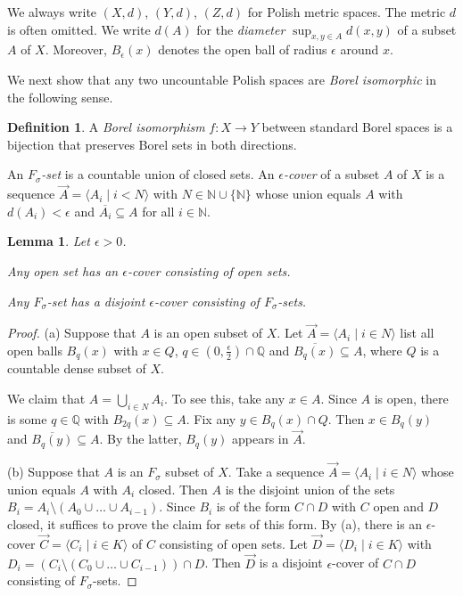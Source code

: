 \documentclass[10pt]{amsart}
\newcommand{\QQ}{\mathbb{Q}}
\newcommand{\NN}{\mathbb{N}}
\newtheorem{lemma}[theorem]{Lemma}
\theoremstyle{definition}
\newtheorem{definition}[theorem]{Definition}
\theoremstyle{remark}
\newenvironment{enumerate-(a)}{\begin{enumerate}[label={\upshape (\alph*)}, leftmargin=2pc]}{\end{enumerate}}
\begin{document}
We always write $(X,d)$, $(Y,d)$, $(Z,d)$ for Polish metric spaces. The metric $d$ is often omitted. 
We write $d(A)$ for the \emph{diameter} $\sup_{x,y\in A} d(x,y)$ of a subset $A$ of $X$. 
Moreover, $B_\epsilon(x)$ denotes the open ball of radius $\epsilon$ around $x$. 

We next show that any two uncountable Polish spaces are \emph{Borel isomorphic} in the following sense. 

\begin{definition} 
A \emph{Borel isomorphism} $f\colon X\rightarrow Y$ between standard Borel spaces is a bijection that preserves Borel sets in both directions. 
\end{definition} 

An \emph{$F_\sigma$-set} is a countable union of closed sets. 
An \emph{$\epsilon$-cover} of a subset $A$ of $X$ is a sequence $\vec{A}=\langle A_i\mid i<N\rangle$ with $N\in \NN\cup\{\NN\}$ whose union equals $A$ with $d(A_i)<\epsilon$ and $\overline{A_i}\subseteq A$ for all $i\in\NN$. 

\begin{lemma} \label{partition epsilon-covers} 
Let $\epsilon>0$. 
\begin{enumerate-(a)} 
\item \label{partition epsilon-covers - open sets} 
Any open set has an $\epsilon$-cover consisting of open sets. 
\item 
Any $F_\sigma$-set has a disjoint $\epsilon$-cover consisting of $F_\sigma$-sets. 
\end{enumerate-(a)} 
\end{lemma} 
\begin{proof} 
(a) 
Suppose that $A$ is an open subset of $X$. 
Let $\vec{A}=\langle A_i\mid i\in N\rangle$ list all open balls $B_q(x)$ with $x\in Q$, $q\in (0,\frac{\epsilon}{2})\cap \QQ$ and $\overline{B_q(x)}\subseteq A$, where $Q$ is a countable dense subset of $X$. 

We claim that $A=\bigcup_{i\in N} A_i$. To see this, take any $x\in A$. 
Since $A$ is open, there is some $q\in \QQ$ with $B_{2q}(x)\subseteq A$. 
Fix any $y\in B_q(x)\cap Q$. 
Then $x\in B_q(y)$ and $\overline{B_q(y)}\subseteq A$. 
By the latter, $B_q(y)$ appears in $\vec{A}$. 

(b) 
Suppose that $A$ is an $F_\sigma$ subset of $X$. 
Take a sequence $\vec{A}=\langle A_i\mid i\in N\rangle$ whose union equals $A$ with $A_i$ closed. 
Then $A$ is the disjoint union of the sets $B_i=A_i\setminus (A_0\cup\dots\cup A_{i-1})$. 
Since $B_i$ is of the form $C\cap D$ with $C$ open and $D$ closed, it suffices to prove the claim for sets of this form. 
By (a), there is an $\epsilon$-cover $\vec{C}=\langle C_i\mid i\in K\rangle$ of $C$ consisting of open sets. 
Let $\vec{D}=\langle D_i\mid i\in K\rangle$ with $D_i=(C_i\setminus (C_0\cup\dots\cup C_{i-1}))\cap D$. 
Then $\vec{D}$ is a disjoint $\epsilon$-cover of $C\cap D$ consisting of $F_\sigma$-sets. 
\end{proof} 
\end{document}
